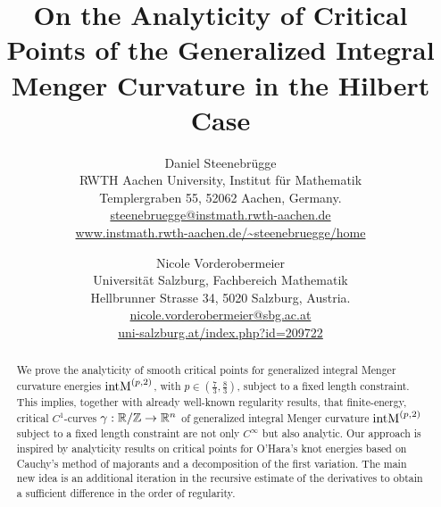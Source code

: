 \documentclass[10pt,a4paper]{article}
\author{
    Daniel Steenebr\"ugge\\
        RWTH Aachen University, Institut für Mathematik\\
        Templergraben 55, 52062 Aachen, Germany.\\
        \href{mailto:steenebruegge@instmath.rwth-aachen.de}{steenebruegge@instmath.rwth-aachen.de}\\
        \url{www.instmath.rwth-aachen.de/~steenebruegge/home}
    \and
    Nicole Vorderobermeier\\
        Universität Salzburg, Fachbereich Mathematik\\
        Hellbrunner Strasse 34, 5020 Salzburg, Austria.\\
        \href{mailto:nicole.vorderobermeier@sbg.ac.at}{nicole.vorderobermeier@sbg.ac.at}\\
        \url{uni-salzburg.at/index.php?id=209722}
}
\makeatletter
\newcommand{\subjclass}[2][2020]{%
	\let\@oldtitle\@title%
	\gdef\@title{\@oldtitle\footnotetext{#1 \emph{Mathematics Subject Classification.} #2}}%
}
\newcommand{\keywords}[1]{%
	\let\@@oldtitle\@title%
	\gdef\@title{\@@oldtitle\footnotetext{\emph{Key words and phrases.} #1.}}%
}
\makeatother
\begin{document}
	\title{On the Analyticity of Critical Points of the Generalized Integral Menger Curvature in the Hilbert Case}
		
	\subjclass{35A20, 35A10, 35B65, 57K10}
	\keywords{Analyticity, knot energy, generalized integral Menger curvature, method of majorants, fractional Leibniz rule, bootstrapping}
	\maketitle
	
	    \begin{abstract}
		We prove the analyticity of smooth critical points for generalized integral Menger curvature energies 
		$\textnormal{intM}^{(p,2)}$, with $p \in (\tfrac 73, \tfrac 83)$, subject to a fixed length constraint. 
		This implies, together with already well-known regularity results, that finite-energy, critical $C^1$-curves $\gamma: \mathbb{R}/\mathbb{Z} \to \mathbb{R}^n$ of generalized integral Menger curvature $\textnormal{intM}^{(p,2)}$ subject to a fixed length constraint are not only $C^\infty$ but also analytic. 
		Our approach is inspired by analyticity results on critical points for O'Hara's knot energies based on Cauchy's method of majorants and a decomposition of the first variation.
		The main new idea is an additional iteration in the recursive estimate of the derivatives 
		to obtain a sufficient difference in the order of regularity.
	\end{abstract}

    
    
    
    
    
    
    
    \appendix
    
    
    
    
\end{document}
